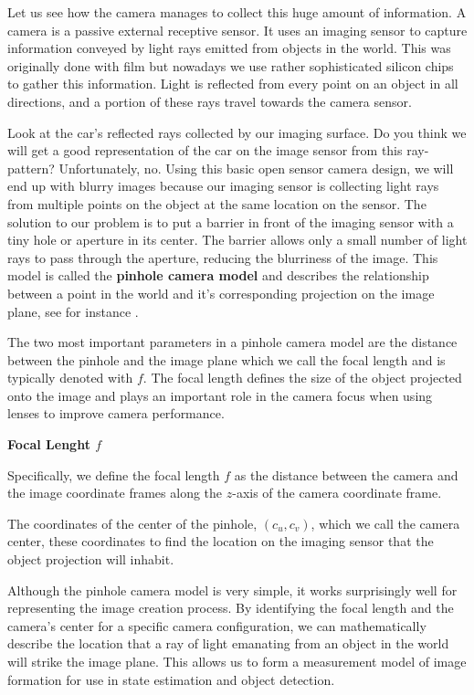 Let us see how the camera manages to collect this huge amount
of information. A camera is a passive
external receptive sensor. It uses an imaging sensor
to capture information conveyed by light rays emitted
from objects in the world. This was originally done with
film but nowadays we use rather sophisticated
silicon chips to gather this information. Light is reflected
from every point on an object in all directions, and a portion of these rays travel towards the camera sensor. 

Look at the car's reflected rays collected by our imaging surface. Do you think we will get
a good representation of the car on the image sensor
from this ray-pattern? Unfortunately, no. Using this basic open
sensor camera design, we will end up with blurry images because our imaging
sensor is collecting light rays from multiple points on the object at the same
location on the sensor. The solution to our problem is to put a barrier in front of the imaging sensor
with a tiny hole or aperture in its center. The barrier allows only a small number of light rays to pass
through the aperture, reducing the blurriness of the image. This model is called the \textbf{pinhole camera model} and describes the relationship between a point in
the world and it's corresponding projection on the image plane, see for instance \cite{PinholeCameraWiki}. 

The two most important parameters in a pinhole camera model are the distance between
the pinhole and the image plane which we call the focal length and is typically denoted with $f$. 
The focal length defines the size of the object projected
onto the image and plays an important role
in the camera focus when using lenses to improve camera performance. 

\begin{framed}
\begin{remark}{\textbf{Focal Lenght $f$}}

Specifically, we define the focal length $f$
as the distance between the camera and the
image coordinate frames along the $z$-axis of
the camera coordinate frame.
\end{remark}
\end{framed}


The coordinates of
the center of the pinhole, $(c_u, c_v)$, which we call the camera center, these coordinates to
find the location on the imaging sensor that the object projection will inhabit. 

Although the pinhole camera model is very simple, it works surprisingly well for representing the image
creation process. By identifying
the focal length and the camera's center for
a specific camera configuration, we can mathematically describe
the location that a ray of light emanating from an object in the world will strike
the image plane. This allows us to form a measurement model of image formation for use in state estimation
and object detection. 


